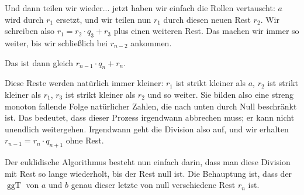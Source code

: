 \begin{spoken-clean}[00:31:04 - 00:32:20]
Und dann teilen wir wieder... jetzt haben wir einfach die Rollen vertauscht: $a$ wird durch $r_1$ ersetzt, und wir teilen nun $r_1$ durch diesen neuen Rest $r_2$. Wir schreiben also $r_1 = r_2 \cdot q_3 + r_3$ plus einen weiteren Rest. Das machen wir immer so weiter, bis wir schließlich bei $r_{n-2}$ ankommen.
\end{spoken-clean}

\begin{spoken-clean}[00:32:20 - 00:33:39]
Das ist dann gleich $r_{n-1} \cdot q_n + r_n$.

Diese Reste werden natürlich immer kleiner: $r_1$ ist strikt kleiner als $a$, $r_2$ ist strikt kleiner als $r_1$, $r_3$ ist strikt kleiner als $r_2$ und so weiter. Sie bilden also eine streng monoton fallende Folge natürlicher Zahlen, die nach unten durch Null beschränkt ist. Das bedeutet, dass dieser Prozess irgendwann abbrechen muss; er kann nicht unendlich weitergehen. Irgendwann geht die Division also auf, und wir erhalten $r_{n-1} = r_n \cdot q_{n+1}$ ohne Rest.

Der euklidische Algorithmus besteht nun einfach darin, dass man diese Division mit Rest so lange wiederholt, bis der Rest null ist. Die Behauptung ist, dass der $\operatorname{ggT}$ von $a$ und $b$ genau dieser letzte von null verschiedene Rest $r_n$ ist.
\end{spoken-clean}

\begin{math-stroke}
\end{math-stroke}

